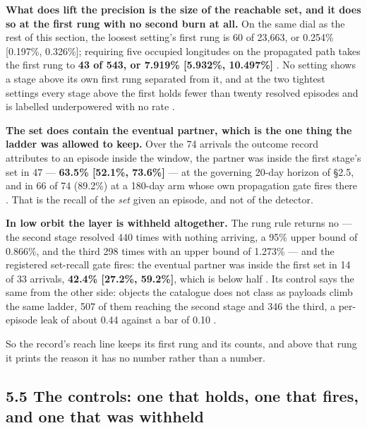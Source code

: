 \documentclass[11pt]{article}
\begin{document}
\textbf{What does lift the precision is the size of the reachable set, and it does so at the first rung with no second burn at all.} On the same dial as the rest of this section, the loosest setting's first rung is 60 of 23,663, or 0.254\% [0.197\%, 0.326\%]; requiring five occupied longitudes on the propagated path takes the first rung to \textbf{43 of 543, or 7.919\% [5.932\%, 10.497\%]}%
. No setting shows a stage above its own first rung separated from it, and at the two tightest settings every stage above the first holds fewer than twenty resolved episodes and is labelled underpowered with no rate%
.

\textbf{The set does contain the eventual partner, which is the one thing the ladder was allowed to keep.} Over the 74 arrivals the outcome record attributes to an episode inside the window, the partner was inside the first stage's set in 47 --- \textbf{63.5\% [52.1\%, 73.6\%]} --- at the governing 20-day horizon of \S{}2.5, and in 66 of 74 (89.2\%) at a 180-day arm whose own propagation gate fires there%
. That is the recall of the \emph{set} given an episode, and not of the detector.

\textbf{In low orbit the layer is withheld altogether.} The rung rule returns no --- the second stage resolved 440 times with nothing arriving, a 95\% upper bound of 0.866\%, and the third 298 times with an upper bound of 1.273\% --- and the registered set-recall gate fires: the eventual partner was inside the first set in 14 of 33 arrivals, \textbf{42.4\% [27.2\%, 59.2\%]}, which is below half%
. Its control says the same from the other side: objects the catalogue does not class as payloads climb the same ladder, 507 of them reaching the second stage and 346 the third, a per-episode leak of about 0.44 against a bar of 0.10%
.

So the record's reach line keeps its first rung and its counts, and above that rung it prints the reason it has no number rather than a number.

\subsection*{5.5 The controls: one that holds, one that fires, and one that was withheld}
\end{document}
